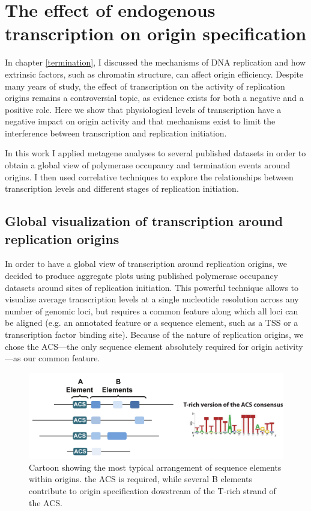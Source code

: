 \chapter{The effect of endogenous transcription on origin specification}


In chapter \ref{termination}, I discussed the mechanisms of DNA replication and how extrinsic factors, such as chromatin structure, can affect origin efficiency. Despite many years of study, the effect of transcription on the activity of replication origins remains a controversial topic, as evidence exists for both a negative and a positive role. 
Here we show that physiological levels of transcription have a negative impact on origin activity and that mechanisms exist to limit the interference between transcription and replication initiation.

In this work I applied metagene analyses to several published datasets in order to obtain a global view of polymerase occupancy and termination events around origins. I then used correlative techniques to explore the relationships between transcription levels and different stages of replication initiation. 

\section{Global visualization of transcription around replication origins}

In order to have a global view of transcription around replication origins, we decided to produce aggregate plots using published polymerase occupancy datasets \cite{schaughency:2014:genomewide} around sites of replication initiation. This powerful technique allows to visualize average transcription levels at a single nucleotide resolution across any number of genomic loci, but requires a common feature along which all loci can be aligned (e.g. an annotated feature or a sequence element, such as a TSS or a transcription factor binding site). Because of the nature of replication origins, we chose the ACS—the only sequence element absolutely required for origin activity—as our common feature. 

\begin{figure}[ht]

\centering
\includegraphics[width=\textwidth]{figures/results/acs}
\caption[ACS consensus and arrangement relative to other origin DNA elements]{Cartoon showing the most typical arrangement of sequence elements within origins. the ACS is required, while several B elements contribute to origin specification dowstream of the T-rich strand of the ACS.}
\label{fig:originSchema}

\end{figure}

